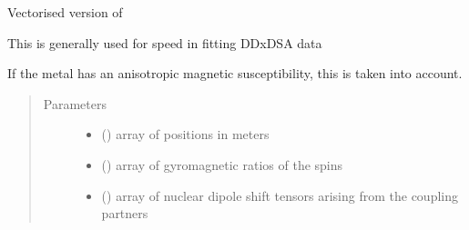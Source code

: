 \documentclass[a4paper,10pt,english]{sphinxmanual}
\begin{document}
\begin{fulllineitems}
\begin{fulllineitems}
\begin{fulllineitems}
\label{\detokenize{reference/generated/paramagpy.metal.Metal.fast_ccr:paramagpy.metal.Metal.fast_ccr}}
Vectorised version of {\hyperref[\detokenize{reference/generated/paramagpy.metal.Metal.ccr:paramagpy.metal.Metal.ccr}]{}}

This is generally used for speed in fitting DDxDSA data

If the metal has an anisotropic magnetic susceptibility, this is
taken into account.
\begin{quote}\begin{description}
\item[{Parameters}] \leavevmode\begin{itemize}
\item {} 
 (\sphinxstyleliteralemphasis{\sphinxupquote{ (}}\sphinxstyleliteralemphasis{\sphinxupquote{,}}\sphinxstyleliteralemphasis{\sphinxupquote{)}}) \textendash{} array of positions in meters

\item {} 
 (\sphinxstyleliteralemphasis{\sphinxupquote{ (}}\sphinxstyleliteralemphasis{\sphinxupquote{,}}\sphinxstyleliteralemphasis{\sphinxupquote{)}}) \textendash{} array of gyromagnetic ratios of the spins

\item {} 
 (\sphinxstyleliteralemphasis{\sphinxupquote{ (}}\sphinxstyleliteralemphasis{\sphinxupquote{,}}\sphinxstyleliteralemphasis{\sphinxupquote{,}}\sphinxstyleliteralemphasis{\sphinxupquote{)}}) \textendash{} array of nuclear dipole shift tensors arising from
the coupling partners

\end{itemize}


\end{description}
\end{quote}
\end{fulllineitems}
\end{fulllineitems}
\end{fulllineitems}
\end{document}
